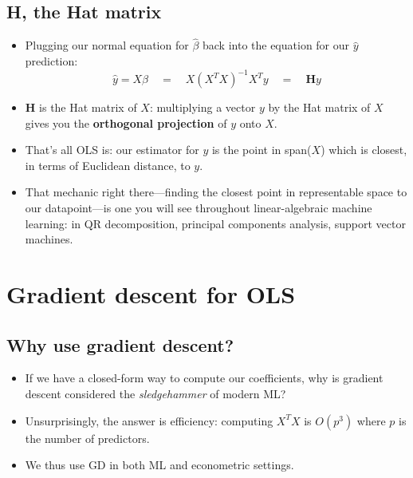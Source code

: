 \documentclass[11pt]{article}
\begin{document}
    \subsection{H, the Hat matrix}
        \begin{itemize}
            \item Plugging our normal equation for $\hat{\beta}$ back into the equation for our $\hat{y}$ prediction: \[\hat{y} = X\beta \quad = \quad X(X^TX)^{-1}X^Ty \quad = \quad \mathbf{H}y\]
            \item $\mathbf{H}$ is the Hat matrix of $X$: multiplying a vector $y$ by the Hat matrix of $X$ gives you the \textbf{orthogonal projection} of $y$ onto $X$.
            \item That's all OLS is: our estimator for $y$ is the point in span($X$) which is closest, in terms of Euclidean distance, to $y$. 
            \item That mechanic right there—finding the closest point in representable space to our datapoint—is one you will see throughout linear-algebraic machine learning: in QR decomposition, principal components analysis, support vector machines.
        \end{itemize}

\section{Gradient descent for OLS}\label{sec:GD}
    \subsection{Why use gradient descent?}
        \begin{itemize}
            \item If we have a closed-form way to compute our coefficients, why is gradient descent considered the \textit{sledgehammer} of modern ML?
            \item Unsurprisingly, the answer is efficiency: computing $X^TX$ is $O(p^3)$ where $p$ is the number of predictors.
            \item We thus use GD in both ML and econometric settings.
        \end{itemize}
\end{document}
